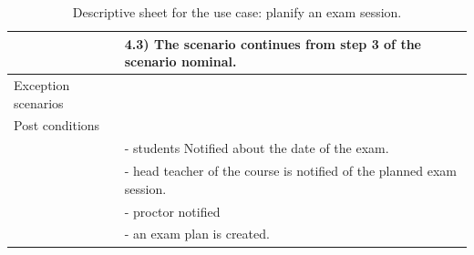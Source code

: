 \documentclass[]{uc2pfecaneva}
\begin{document}
\begin{table}[t]
\begin{tabularx}{\textwidth}{|l|X|}
            & \hspace{4mm}4.3) The scenario continues from step 3 of the scenario nominal.                                                                                      \\ \hline
            Exception scenarios   &                                                                                                                                                                   \\ \hline
            Post conditions       &                                                                                                                                                                   \\
            & - students Notified about the date of the exam.                                                                                                                   \\
            & - head teacher of the course is notified of the planned exam session.                                                                                             \\
            & - proctor notified                                                                                           \\
            & - an exam plan is created.                                                                                                                               \\ \hline
        \end{tabularx}
        \caption{Descriptive sheet for the use case: planify an exam session.}
        \label{table:2}
    \end{table}
    \clearpage
\end{document}
